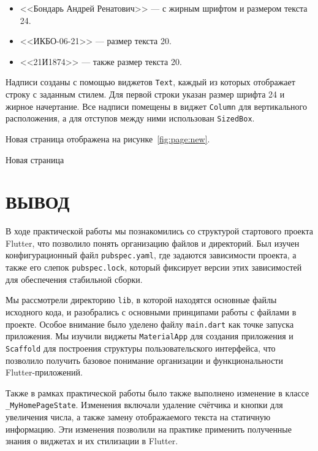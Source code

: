 \begin{itemize}
	\item <<Бондарь Андрей Ренатович>> --- с жирным шрифтом
		и размером текста 24.
	\item <<ИКБО-06-21>> --- размер текста 20.
	\item <<21И1874>> --- также размер текста 20.
\end{itemize}

Надписи созданы с помощью виджетов \texttt{Text},
каждый из которых отображает строку с заданным стилем.
Для первой строки указан размер шрифта 24 и жирное начертание.
Все надписи помещены в виджет \texttt{Column} для вертикального расположения,
а для отступов между ними использован \texttt{SizedBox}.\par
Новая страница отображена на рисунке~\ref{fig:page:new}.

\begin{image}
	\caption{Новая страница}
	\label{fig:page:new}
\end{image}

\clearpage

\section*{ВЫВОД}

В ходе практической работы мы познакомились
со структурой стартового проекта Flutter,
что позволило понять организацию файлов и директорий.
Был изучен конфигурационный файл \texttt{pubspec.yaml},
где задаются зависимости проекта, а также его слепок \texttt{pubspec.lock},
который фиксирует версии этих зависимостей
для обеспечения стабильной сборки.\par
Мы рассмотрели директорию \texttt{lib},
в которой находятся основные файлы исходного кода,
и разобрались с основными принципами работы с файлами в проекте.
Особое внимание было уделено файлу \texttt{main.dart}
как точке запуска приложения.
Мы изучили виджеты \texttt{MaterialApp} для создания приложения
и \texttt{Scaffold} для построения структуры пользовательского интерфейса,
что позволило получить базовое понимание организации
и функциональности Flutter-приложений.\par
Также в рамках практической работы было также выполнено изменение
в классе \texttt{\_MyHomePageState}.
Изменения включали удаление счётчика и кнопки для увеличения числа,
а также замену отображаемого текста на статичную информацию.
Эти изменения позволили на практике применить полученные знания о виджетах
и их стилизации в Flutter.

